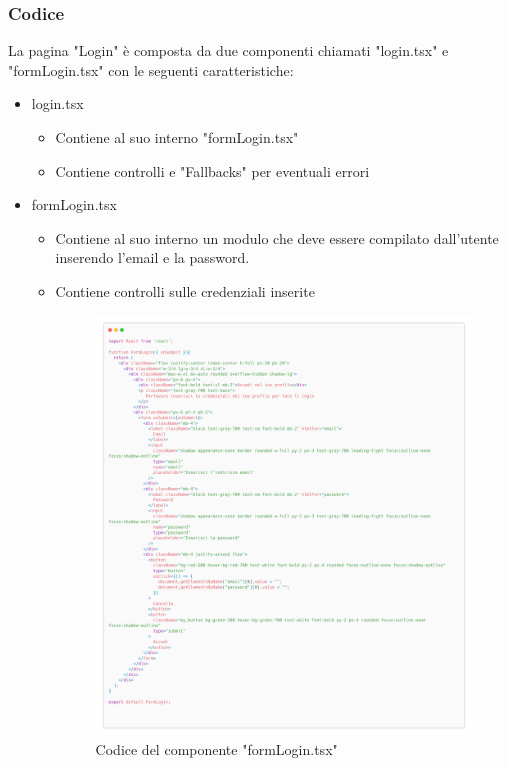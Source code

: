 \documentclass{report}
\begin{document}
\subsubsection*{Codice}
La pagina "Login" è composta da due componenti chiamati "login.tsx" e "formLogin.tsx" con le seguenti caratteristiche:
\begin{itemize}
	\item login.tsx
	\begin{itemize}
		\item Contiene al suo interno "formLogin.tsx"
		\item Contiene controlli e "Fallbacks" per eventuali errori
	\end{itemize}
	\item formLogin.tsx
	\begin{itemize}
		\item Contiene al suo interno un modulo che deve essere compilato dall'utente inserendo l'email e la password.
		\item Contiene controlli sulle credenziali inserite
		\begin{figure}[H]
			\centering\includegraphics[width=1\textwidth]{images/microservizio-autenticazione/frontend/formLogin-carbon.png}
			Codice del componente "formLogin.tsx"
		\end{figure}
	\end{itemize}
\end{itemize}
\end{document}
